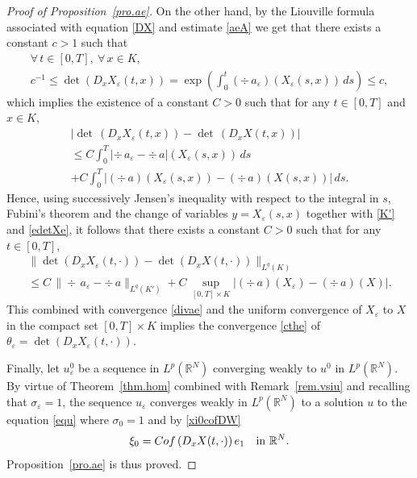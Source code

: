 \documentclass[11pt]{article}
\def \RR {\mathbb R}
\theoremstyle{plain}
\theoremstyle{definition}
\numberwithin{equation}{section}
\begin{document}
\begin{proof}[Proof of Proposition~\ref{pro.ae}]
On the other hand, by the Liouville formula associated with equation \eqref{DX} and estimate \eqref{aeA} we get that there exists a constant $c>1$ such that
\begin{multline}\label{edetXe}
\forall\,t\in[0,T],\ \forall\,x\in K,\\[-5pt]
c^{-1}\leq \det\left(D_xX_\varepsilon(t,x)\right)=\exp\left(\int_0^t (\div\,a_\varepsilon)(X_\varepsilon(s,x))\,ds\right)\leq c,
\end{multline}
which implies the existence of a constant $C>0$ such that for any $t\in[0,T]$ and $x\in K$,
\begin{multline*}
\big|\det\,(D_xX_\varepsilon(t,x))-\det\,(D_xX(t,x))\big|
\\
\leq C\int_0^T\!\!|\div\,a_\varepsilon-\div\,a|(X_\varepsilon(s,x))\,ds\\[-5pt]
+C\int_0^T\!\!\big|(\div\,a)(X_\varepsilon(s,x))-(\div\,a)(X(s,x))\big|\,ds.
\end{multline*}
Hence, using successively Jensen's inequality with respect to the integral in $s$, Fubini's theorem and the change of variables $y=X_\varepsilon(s,x)$ together with \eqref{K'} and \eqref{edetXe}, it follows that there exists a constant $C>0$ such that for any $t\in[0,T]$,
\begin{multline*}
\big\|\det\left(D_x X_\varepsilon(t,\cdot)\right)-\det\left(D_x X(t,\cdot)\right)\big\|_{L^q(K)}
\\
\leq C\,\|\div\,a_\varepsilon-\div\,a\|_{L^q(K')}+C\,\sup_{[0,T]\times K}\big|(\div\,a)(X_\varepsilon)-(\div\,a)(X)\big|.
\end{multline*}
This combined with convergence \eqref{divae} and the uniform convergence of $X_\varepsilon$ to $X$ in the compact set $[0,T]\times K$ implies the convergence \eqref{cthe} of $\theta_\varepsilon=\det (D_xX_\varepsilon(t,\cdot))$.

Finally, let $u_\varepsilon^0$ be a sequence in $L^p(\RR^N)$ converging weakly to $u^0$ in $L^p(\RR^N)$. By virtue of Theorem~\ref{thm.hom} combined with Remark~\ref{rem.vsiu} and recalling that $\sigma_\varepsilon=1$, the sequence $u_\varepsilon$ converges weakly in $L^p(\RR^N)$ to a solution $u$ to the equation \eqref{equ} where $\sigma_0=1$ and by \eqref{xi0cofDW}
\[
\xi_0={\rm Cof}\,(D_x X(t,\cdot))\,e_1\quad\mbox{in }\RR^N.
\]
Proposition~\ref{pro.ae} is thus proved.
\end{proof}


\end{document}
